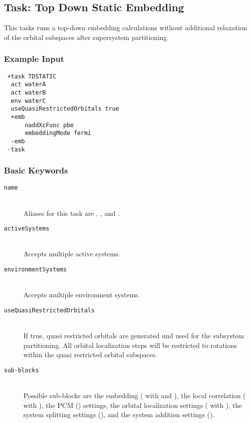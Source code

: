 \subsection{Task: Top Down Static Embedding}\label{sec:tasks:TopDownStaticEmbedding}
This tasks runs a top-down embedding calculations without additional relaxation of the orbital subspaces after supersystem partitioning.

\subsubsection{Example Input}
\begin{lstlisting}
 +task TDSTATIC
  act waterA
  act waterB
  env waterC
  useQuasiRestrictedOrbitals true
  +emb
      naddXcFunc pbe
      embeddingMode fermi
  -emb
 -task
\end{lstlisting}

\subsubsection{Basic Keywords}
\begin{description}
    \item [\texttt{name}]\hfill \\
    Aliases for this task are , , and .
    \item [\texttt{activeSystems}]\hfill \\
    Accepts multiple active systems.
    \item [\texttt{environmentSystems}]\hfill \\
    Accepts multiple environment systems.
    \item [\texttt{useQuasiRestrictedOrbitals}]\hfill \\
    If true, quasi restricted orbitals are generated und used for the subsystem partitioning.
    All orbital localization steps will be restricted to rotations within the quasi restricted orbital subspaces.
    \item[\texttt{sub-blocks}]\hfill \\
    Possible sub-blocks are the embedding ( with  and ), the local correlation ( with ),
    the PCM () settings, the orbital localization settings ( with ), the system splitting settings (),
    and the system addition settings ().

\end{description}
